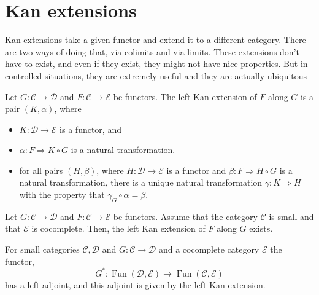 \section{Kan extensions}

Kan extensions take a given functor and extend it to a different category. There are two ways of doing that, via colimits and via limits. These extensions don’t have to exist, and even if they exist, they might not have nice properties. But in controlled situations, they are extremely useful and they are actually ubiquitous

Let $G: \mathcal{C} \rightarrow \mathcal{D}$ and $F: \mathcal{C} \rightarrow \mathcal{E}$ be functors. The left Kan extension of $F$ along $G$ is a pair $(K, \alpha)$, where
\begin{itemize}
    \item $K: \mathcal{D} \rightarrow \mathcal{E}$ is a functor, and
    \item $\alpha: F \Rightarrow K \circ G$ is a natural transformation. %
    \item for all pairs $(H, \beta)$, where $H: \mathcal{D} \rightarrow \mathcal{E}$ is a functor and $\beta: F \Rightarrow H \circ G$ is a natural transformation, there is a unique natural transformation $\gamma: K \Rightarrow H$ with the property that $\gamma_G \circ \alpha=\beta$.
\end{itemize}




\begin{theo}
Let $G: \mathcal{C} \rightarrow \mathcal{D}$ and $F: \mathcal{C} \rightarrow \mathcal{E}$ be functors. Assume that the category $\mathcal{C}$ is small and that $\mathcal{E}$ is cocomplete. Then, the left Kan extension of $F$ along $G$ exists.
\end{theo}

\begin{theo}
For small categories $\mathcal{C}, \mathcal{D}$ and $G: \mathcal{C} \rightarrow \mathcal{D}$ and a cocomplete category $\mathcal{E}$ the functor,
$$
G^*: \operatorname{Fun}(\mathcal{D}, \mathcal{E}) \rightarrow \operatorname{Fun}(\mathcal{C}, \mathcal{E})
$$
has a left adjoint, and this adjoint is given by the left Kan extension.
\end{theo}

